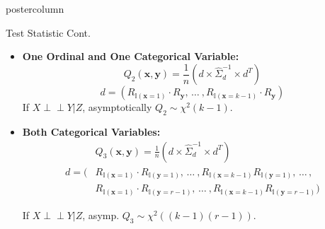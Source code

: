 \documentclass{beamer}
\def\ci{\perp\!\!\!\!\!\perp}
\newlength{\columnheight}
\begin{document}
\begin{frame}
\begin{columns}
	\begin{column}{.33\textwidth}
		\begin{beamercolorbox}[center]{postercolumn}
			\begin{minipage}{.98\textwidth} %
				\parbox[t][\columnheight]{\textwidth}{ %
	\begin{myblock}{Test Statistic Cont.}
		\begin{itemize}
			\setlength\itemsep{0.5em}
			\item \textbf{One Ordinal and One Categorical Variable:}
						$$ Q_2(\bm{x}, \bm{y}) = \frac{1}{n} (d \times \hat{\Sigma}_d^{-1} \times d^T) $$
						$$ d = (R_{\mathbb{I}(\mathbf{x}=1)} \cdot R_{\mathbf{y}}, \, \ldots \ , R_{\mathbb{I}(\mathbf{x}=k-1)} \cdot R_{\mathbf{y}}) $$
				If $ X \ci Y | Z $, asymptotically $ Q_2 \sim \chi^2(k-1) $.
			\item \textbf{Both Categorical Variables:}
			\begin{equation*}
				\begin{split}
					& Q_3(\bm{x}, \bm{y}) = \frac{1}{n} (d \times \hat{\Sigma}_d^{-1} \times d^T) \\
				d = (&R_{\mathbb{I}(\mathbf{x}=1)} \cdot R_{\mathbb{I}(\mathbf{y}=1)}, \, \ldots \ ,
						R_{\mathbb{I}(\mathbf{x}=k-1)} R_{\mathbb{I}(\mathbf{y}=1)}, \, \ldots \, , \\
				     &R_{\mathbb{I}(\mathbf{x}=1)} \cdot R_{\mathbb{I}(\mathbf{y}=r-1)}, \, \ldots \ ,
						R_{\mathbb{I}(\mathbf{x}=k-1)} R_{\mathbb{I}(\mathbf{y}=r-1)}) 
				\end{split}
			\end{equation*}
			
			If $ X \ci Y | Z $, asymp. $ Q_3 \sim \chi^2((k-1)(r-1)) $.
		\end{itemize}


\end{myblock}}
\end{minipage}
\end{beamercolorbox}
\end{column}
\end{columns}
\end{frame}
\end{document}
